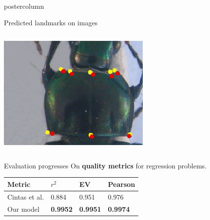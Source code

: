 \begin{frame}
\begin{columns}
\begin{column}{.49\textwidth}
\begin{beamercolorbox}[center,wd=\textwidth]{postercolumn}
\begin{minipage}[T]{.95\textwidth}
{\begin{block}{Predicted landmarks on images}
\begin{columns}
\begin{column}{.45\textwidth}
            			\includegraphics[width=.95\textwidth]{images/Prono_036.eps}
            		\end{column}
            	\end{columns}
            \end{block}
            
            \vfill
            
            \begin{block}{Evaluation progresses}
            On \textbf{quality metrics} for regression problems. \\[0.2cm]
            \begin{center}            	
           		\begin{tabu} to 0.9\textwidth {| X[l] | X[c] | X[c] | X[c] |}
            		\hline
            		Metric\footnotemark[1] & $r^2$ & EV & Pearson \\ \hline
            		Cintas et al.\cite{cintas2016automatic} & 0.884 & 0.951 & 0.976 \\ \hline                 		    		{} Our model & \textbf{0.9952} & \textbf{0.9951} & \textbf{0.9974} \\ \hline
            	\end{tabu}            
            	
            \end{center}
            

\end{block}}
\end{minipage}
\end{beamercolorbox}
\end{column}
\end{columns}
\end{frame}
